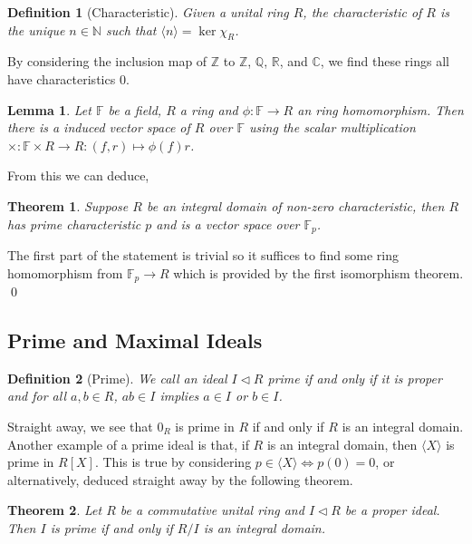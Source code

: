 \documentclass[
]{article}
\newtheorem{theorem}{Theorem}
\newtheorem{lemma}{Lemma}
\newtheorem{definition}{Definition}[theorem]
\begin{document}
\begin{definition}[Characteristic]
  Given a unital ring \(R\), the characteristic of \(R\) is the unique 
  \(n \in \mathbb{N}\) such that \(\langle n \rangle = \ker \chi_R\).
\end{definition}

By considering the inclusion map of \(\mathbb{Z}\) to \(\mathbb{Z}\),
\(\mathbb{Q}\), \(\mathbb{R}\), and \(\mathbb{C}\), we find these rings
all have characteristics \(0\).

\begin{lemma}
  Let \(\mathbb{F}\) be a field, \(R\) a ring and 
  \(\phi : \mathbb{F} \to R\) an ring homomorphism. Then there is a induced 
  vector space of \(R\) over \(\mathbb{F}\) using the scalar multiplication 
  \(\times : \mathbb{F} \times R \to R : (f, r) \mapsto \phi(f) r\).
\end{lemma}

From this we can deduce,

\begin{theorem}
  Suppose \(R\) be an integral domain of non-zero characteristic, then \(R\) has 
  prime characteristic \(p\) and is a vector space over \(\mathbb{F}_p\).
\end{theorem}
\proof

The first part of the statement is trivial so it suffices to find some
ring homomorphism from \(\mathbb{F}_p \to R\) which is provided by the
first isomorphism theorem. \qed

\hypertarget{prime-and-maximal-ideals}{%
\subsection{Prime and Maximal Ideals}\label{prime-and-maximal-ideals}}

\begin{definition}[Prime]
  We call an ideal \(I \triangleleft R\) prime if and only if it is proper and 
  for all \(a, b \in R\), \(ab \in I\) implies \(a \in I\) or \(b \in I\).
\end{definition}

Straight away, we see that \({0_R}\) is prime in \(R\) if and only if
\(R\) is an integral domain. Another example of a prime ideal is that,
if \(R\) is an integral domain, then \(\langle X \rangle\) is prime in
\(R[X]\). This is true by considering
\(p \in \langle X \rangle \iff p(0) = 0\), or alternatively, deduced
straight away by the following theorem.

\begin{theorem}
  Let \(R\) be a commutative unital ring and \(I \triangleleft R\) be a proper 
  ideal. Then \(I\) is prime if and only if \(R / I\) is an integral domain.
\end{theorem}
\proof
\end{document}

